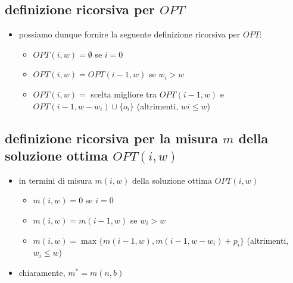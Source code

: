 \subsection*{definizione ricorsiva per $OPT$}
\begin{flushleft}
	\begin{itemize}
		\item possiamo dunque fornire la seguente definizione ricorsiva per $OPT$:
		\begin{itemize}
			\item $OPT(i,w)=\emptyset$ se $i=0$
			\item $OPT(i,w)=OPT(i-1,w)$ se $w_i>w$
			\item $OPT(i,w)=$ scelta migliore tra $OPT(i-1,w)$ e $OPT(i-1,w-w_i)\cup\{o_i\}$ (altrimenti, $wi\leq w$)
		\end{itemize}
	\end{itemize}
\end{flushleft}


\subsection*{definizione ricorsiva per la misura $m$ della soluzione ottima $OPT(i,w)$}
\begin{flushleft}
	\begin{itemize}
		\item in termini di misura $m(i,w)$ della soluzione ottima $OPT(i,w)$
		\begin{itemize}
			\item $m(i,w)=0$ se $i=0$
			\item $m(i,w)=m(i-1,w)$ se $w_i>w$
			\item $m(i,w)=\max\{m(i-1,w),m(i-1,w-w_i)+p_i\}$ (altrimenti, $w_i\leq w$)
		\end{itemize}
		\item chiaramente, $m^*=m(n,b)$
	\end{itemize}
\end{flushleft}


